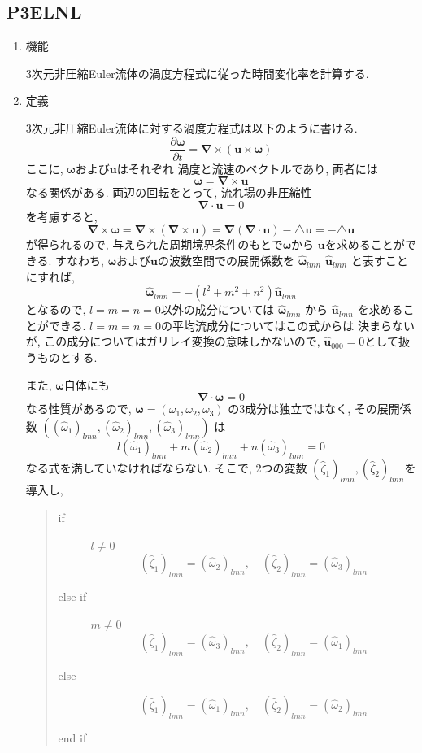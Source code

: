 \documentclass[a4j,fleqn]{jarticle}
\begin{document}

\subsection{P3ELNL}

\begin{enumerate}

\item 機能 

3次元非圧縮Euler流体の渦度方程式に従った時間変化率を計算する.

\item 定義

3次元非圧縮Euler流体に対する渦度方程式は以下のように書ける.
\[
\frac{\partial\boldsymbol{\omega}}{\partial t}=
\boldsymbol{\nabla}\times(\boldsymbol{u}\times\boldsymbol{\omega})
\]
ここに, $\boldsymbol{\omega}$および$\boldsymbol{u}$はそれぞれ
渦度と流速のベクトルであり, 両者には
\[
\boldsymbol{\omega}=\boldsymbol{\nabla}\times\boldsymbol{u}
\]
なる関係がある. 両辺の回転をとって, 流れ場の非圧縮性
\[
\boldsymbol{\nabla}\cdot\boldsymbol{u}=0
\]
を考慮すると, 
\[
\boldsymbol{\nabla}\times\boldsymbol{\omega}
=\boldsymbol{\nabla}\times(\boldsymbol{\nabla}\times\boldsymbol{u})
=\boldsymbol{\nabla}(\boldsymbol{\nabla}\cdot\boldsymbol{u})
 -\triangle\boldsymbol{u}
=-\triangle\boldsymbol{u}
\]
が得られるので, 与えられた周期境界条件のもとで$\boldsymbol{\omega}$から
$\boldsymbol{u}$を求めることができる.
すなわち,
$\boldsymbol{\omega}$および$\boldsymbol{u}$の波数空間での展開係数を
$\hat{\boldsymbol{\omega}}_{lmn}$
$\hat{\boldsymbol{u}}_{lmn}$
と表すことにすれば, 
\[
\hat{\boldsymbol{\omega}}_{lmn}
=-(l^2+m^2+n^2)\hat{\boldsymbol{u}}_{lmn}
\]
となるので, $l=m=n=0$以外の成分については
$\hat{\boldsymbol{\omega}}_{lmn}$
から
$\hat{\boldsymbol{u}}_{lmn}$
を求めることができる. $l=m=n=0$の平均流成分についてはこの式からは
決まらないが, この成分についてはガリレイ変換の意味しかないので,
$\hat{\boldsymbol{u}}_{000}=0$として扱うものとする.

また, $\boldsymbol{\omega}$自体にも
\[
\boldsymbol{\nabla}\cdot\boldsymbol{\omega}=0
\]
なる性質があるので, $\boldsymbol{\omega}=(\omega_1,\omega_2,\omega_3)$
の3成分は独立ではなく, その展開係数
$((\hat{\omega}_1)_{lmn},(\hat{\omega}_2)_{lmn},(\hat{\omega}_3)_{lmn})$
は
\[
l(\hat{\omega}_1)_{lmn}+m(\hat{\omega}_2)_{lmn}+n(\hat{\omega}_3)_{lmn}=0
\]
なる式を満していなければならない. そこで, 2つの変数
$(\hat{\zeta}_1)_{lmn},(\hat{\zeta}_2)_{lmn}$を導入し,
\begin{quote}
\begin{description}
\item[if] $l\neq 0$
\[
(\hat{\zeta}_1)_{lmn}=(\hat{\omega}_2)_{lmn},\quad
(\hat{\zeta}_2)_{lmn}=(\hat{\omega}_3)_{lmn}
\]
\item[else if] $m\neq 0$
\[
(\hat{\zeta}_1)_{lmn}=(\hat{\omega}_3)_{lmn},\quad
(\hat{\zeta}_2)_{lmn}=(\hat{\omega}_1)_{lmn}
\]
\item[else] 
\[
(\hat{\zeta}_1)_{lmn}=(\hat{\omega}_1)_{lmn},\quad
(\hat{\zeta}_2)_{lmn}=(\hat{\omega}_2)_{lmn}
\]
\item[end if]


\end{description}
\end{quote}
\end{enumerate}
\end{document}
